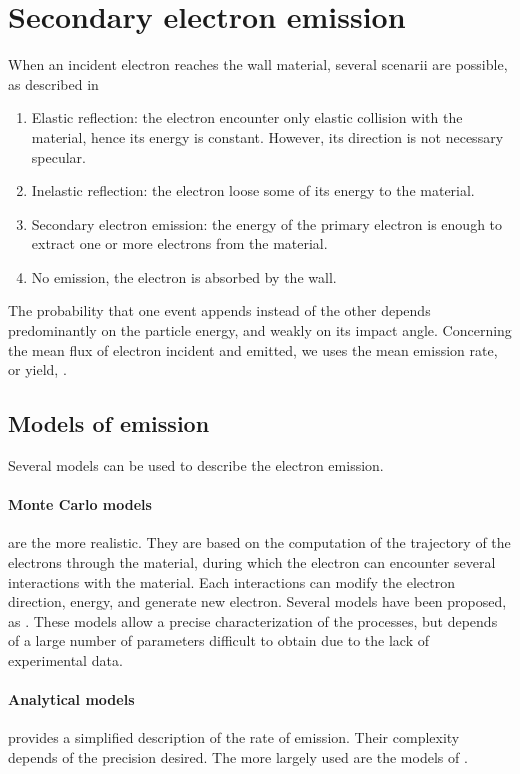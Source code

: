 
\section{Secondary electron emission}
\label{sec-seemodel}
When an incident electron reaches the wall material, several scenarii are possible, as described in \citet{villemant}
\begin{enumerate}
  \item Elastic reflection: the electron encounter only elastic collision with the material, hence its energy is constant. However, its direction is not necessary specular.
  \item Inelastic reflection: the electron loose some of its energy to the material.
  \item Secondary electron emission: the energy of the primary electron is enough to extract one or more electrons from the material.
  \item No emission, the electron is absorbed by the wall.
\end{enumerate}

The probability \proba  that one event appends instead of the other depends predominantly on the particle energy, and weakly on its  impact angle.
Concerning the mean flux of electron incident and emitted, we uses the mean emission rate, or yield, \rate.

\subsection{Models of emission } \label{subsec-seemodels}
Several models can be used to describe the electron emission.

\paragraph{Monte Carlo models} are the more realistic.
 They are based on the computation of the trajectory of the electrons through the material, during which the electron can encounter several interactions with the material.
 Each interactions can modify the electron direction, energy, and generate new electron.
 Several models have been proposed, as \citet{furman2002,pierron2017}.
 These models allow a precise characterization of the processes, but depends of a large number of parameters difficult to obtain due to the lack of experimental data.
 
\paragraph{Analytical models} provides a simplified description of the rate of emission.
Their complexity depends of the precision desired.
The more largely used are the models of \citet{vaughan1989,barral2003a,sydorenko2006b}.

